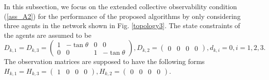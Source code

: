 \documentclass[journal,transmag]{IEEEtran}
\begin{document}
{	In this subsection, we focus on the extended collective observability condition (\ref{ass_A2}) for the performance of the proposed algorithms by only considering three agents in the network shown in Fig. \ref{topology3}.    The state constraints of the agents are assumed to be
	$D_{k,1}=D_{k,3}=\left(
	\begin{smallmatrix}
	1 & -\tan\theta& 0 & 0\\
	0  &  0       &  1&-\tan\theta
	\end{smallmatrix}
	\right),
	D_{k,2}=\left(
	\begin{smallmatrix}
	0 & 0& 0 & 0
	\end{smallmatrix}
	\right),d_{k,i}=0,i=1,2,3.$
	The observation matrices are supposed to have the following forms $	H_{k,1}=H_{k,3}=\left(
	\begin{smallmatrix}
	1 & 0& 0 & 0
	\end{smallmatrix}
	\right),
	H_{k,2}=\left(
	\begin{smallmatrix}
	0 & 0& 0 & 0
	\end{smallmatrix}
	\right).$
	\begin{figure}[htp]

\end{figure}}
\end{document}
